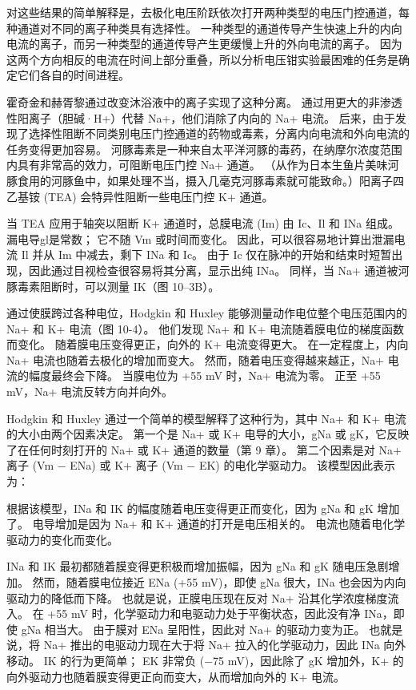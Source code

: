 对这些结果的简单解释是，去极化电压阶跃依次打开两种类型的电压门控通道，每种通道对不同的离子种类具有选择性。 
一种类型的通道传导产生快速上升的内向电流的离子，而另一种类型的通道传导产生更缓慢上升的外向电流的离子。 
因为这两个方向相反的电流在时间上部分重叠，所以分析电压钳实验最困难的任务是确定它们各自的时间进程。


霍奇金和赫胥黎通过改变沐浴液中的离子实现了这种分离。 通过用更大的非渗透性阳离子（胆碱·H+）代替 Na+，他们消除了内向的 Na+ 电流。 
后来，由于发现了选择性阻断不同类别电压门控通道的药物或毒素，分离内向电流和外向电流的任务变得更加容易。 
河豚毒素是一种来自太平洋河豚的毒药，在纳摩尔浓度范围内具有非常高的效力，可阻断电压门控 Na+ 通道。 
（从作为日本生鱼片美味河豚食用的河豚鱼中，如果处理不当，摄入几毫克河豚毒素就可能致命。）阳离子四乙基铵 (TEA) 会特异性阻断一些电压门控 K+ 通道。


当 TEA 应用于轴突以阻断 K+ 通道时，总膜电流 (Im) 由 Ic、Il 和 INa 组成。 
漏电导gl是常数； 它不随 Vm 或时间而变化。 因此，可以很容易地计算出泄漏电流 Il 并从 Im 中减去，剩下 INa 和 Ic。 
由于 Ic 仅在脉冲的开始和结束时短暂出现，因此通过目视检查很容易将其分离，显示出纯 INa。 
同样，当 Na+ 通道被河豚毒素阻断时，可以测量 IK（图 10–3B）。


通过使膜跨过各种电位，Hodgkin 和 Huxley 能够测量动作电位整个电压范围内的 Na+ 和 K+ 电流（图 10-4）。 
他们发现 Na+ 和 K+ 电流随着膜电位的梯度函数而变化。 
随着膜电压变得更正，向外的 K+ 电流变得更大。 
在一定程度上，内向 Na+ 电流也随着去极化的增加而变大。 
然而，随着电压变得越来越正，Na+ 电流的幅度最终会下降。 
当膜电位为 +55 mV 时，Na+ 电流为零。 
正至 +55 mV，Na+ 电流反转方向并向外。


Hodgkin 和 Huxley 通过一个简单的模型解释了这种行为，其中 Na+ 和 K+ 电流的大小由两个因素决定。 
第一个是 Na+ 或 K+ 电导的大小，gNa 或 gK，它反映了在任何时刻打开的 Na+ 或 K+ 通道的数量（第 9 章）。 
第二个因素是对 Na+ 离子 (Vm − ENa) 或 K+ 离子 (Vm − EK) 的电化学驱动力。 
该模型因此表示为：


根据该模型，INa 和 IK 的幅度随着电压变得更正而变化，因为 gNa 和 gK 增加了。 
电导增加是因为 Na+ 和 K+ 通道的打开是电压相关的。 
电流也随着电化学驱动力的变化而变化。


INa 和 IK 最初都随着膜变得更积极而增加振幅，因为 gNa 和 gK 随电压急剧增加。 
然而，随着膜电位接近 ENa (+55 mV)，即使 gNa 很大，INa 也会因为内向驱动力的降低而下降。 也就是说，正膜电压现在反对 Na+ 沿其化学浓度梯度流入。 
在 +55 mV 时，化学驱动力和电驱动力处于平衡状态，因此没有净 INa，即使 gNa 相当大。 
由于膜对 ENa 呈阳性，因此对 Na+ 的驱动力变为正。 
也就是说，将 Na+ 推出的电驱动力现在大于将 Na+ 拉入的化学驱动力，因此 INa 向外移动。 
IK 的行为更简单； EK 非常负 (−75 mV)，因此除了 gK 增加外，K+ 的向外驱动力也随着膜变得更正向而变大，从而增加向外的 K+ 电流。



